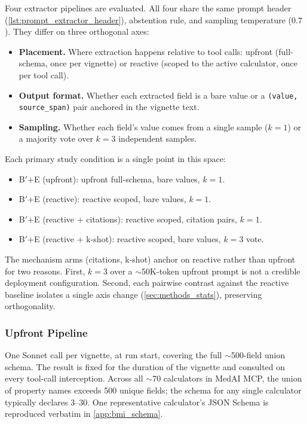 Four extractor pipelines are evaluated. All four share the same
prompt header (\cref{lst:prompt_extractor_header}), abstention rule,
and sampling temperature ($0.7$). They differ on three orthogonal
axes:

\begin{itemize}\setlength\itemsep{2pt}
  \item \textbf{Placement.} Where extraction happens relative to tool
        calls: upfront (full-schema, once per vignette) or reactive
        (scoped to the active calculator, once per tool call).
  \item \textbf{Output format.} Whether each extracted field is a
        bare value or a \texttt{(value, source\_span)} pair anchored
        in the vignette text.
  \item \textbf{Sampling.} Whether each field's value comes from a
        single sample ($k=1$) or a majority vote over $k=3$
        independent samples.
\end{itemize}

Each primary study condition is a single point in this space:

\begin{itemize}\setlength\itemsep{2pt}
  \item B$'$+E (upfront): upfront full-schema, bare values, $k=1$.
  \item B$'$+E (reactive): reactive scoped, bare values, $k=1$.
  \item B$'$+E (reactive + citations): reactive scoped, citation pairs, $k=1$.
  \item B$'$+E (reactive + k-shot): reactive scoped, bare values, $k=3$ vote.
\end{itemize}

The mechanism arms (citations, k-shot) anchor on reactive rather
than upfront for two reasons. First, $k=3$ over a $\sim$50K-token
upfront prompt is not a credible deployment configuration. Second,
each pairwise contrast against the reactive baseline isolates a
single axis change (\cref{sec:methods_stats}), preserving
orthogonality.

\subsubsection{Upfront Pipeline}
\label{sec:methods_extractor_upfront}

One Sonnet call per vignette, at run start, covering the full
$\sim$500-field union schema. The result is fixed for the duration of
the vignette and consulted on every tool-call interception. Across
all $\sim$70 calculators in MedAI MCP, the union of property names
exceeds 500 unique fields; the schema for any single calculator
typically declares 3--30. One representative calculator's JSON
Schema is reproduced verbatim in \cref{app:bmi_schema}.

